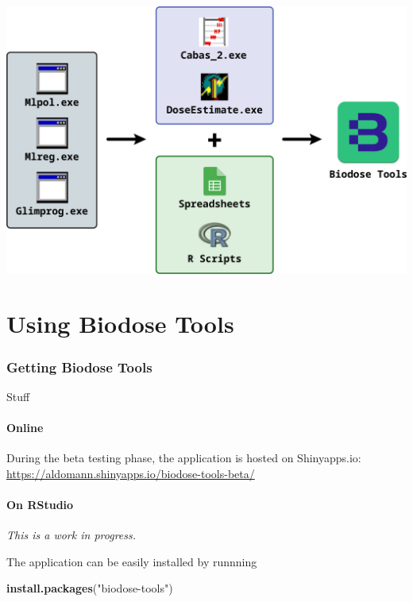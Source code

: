 \documentclass[]{scrartcl}
\newenvironment{Shaded}{\begin{snugshade}}{\end{snugshade}}
\newcommand{\KeywordTok}[1]{\textcolor[rgb]{0.13,0.29,0.53}{\textbf{#1}}}
\newcommand{\NormalTok}[1]{#1}
\newcommand{\StringTok}[1]{\textcolor[rgb]{0.31,0.60,0.02}{#1}}
\begin{document}
\includegraphics{images/intro/chronology.pdf}

\hypertarget{part-using-biodose-tools}{%
\part{Using Biodose Tools}\label{part-using-biodose-tools}}

\hypertarget{get}{%
\section{Getting Biodose Tools}\label{get}}

Stuff

\hypertarget{get-online}{%
\subsection{Online}\label{get-online}}

During the beta testing phase, the application is hosted on Shinyapps.io: \url{https://aldomann.shinyapps.io/biodose-tools-beta/}

\hypertarget{get-offline}{%
\subsection{On RStudio}\label{get-offline}}

\emph{This is a work in progress.}

The application can be easily installed by runnning

\begin{Shaded}
\begin{Highlighting}[]
\KeywordTok{install.packages}\NormalTok{(}\StringTok{"biodose-tools"}\NormalTok{)}
\end{Highlighting}
\end{Shaded}
\end{document}
